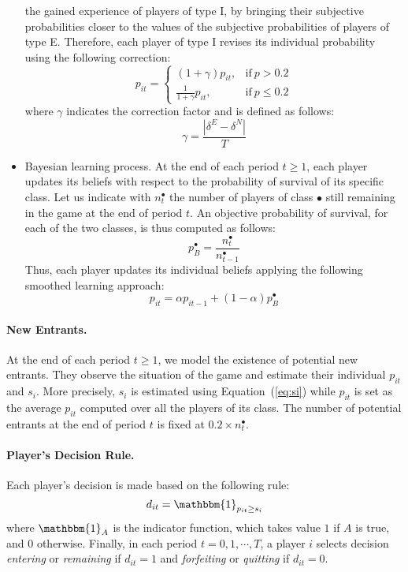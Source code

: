 \documentclass{article}
\begin{document}
\begin{itemize}
the gained experience of players of type I, by bringing their subjective
probabilities closer to the values of the subjective
probabilities of players of type E. Therefore, each player of type I revises
its individual probability using the following correction:
\begin{equation}
p_{it}=\begin{cases}
\left( 1+\gamma \right)p_{it}, & \text{if}~p > 0.2\\
\displaystyle \frac{1}{1+\gamma}p_{it}, & \text{if}~p \leq 0.2
\end{cases}
\label{eq:correction}
\end{equation}
where $\gamma$ indicates the correction factor and is defined as follows:
\begin{equation}
\gamma = \frac{|\delta^E-\delta^N|}{T}
\label{eq:gamma}
\end{equation}
\item Bayesian learning process. At the end of each period $t \geq 1$, each player
updates its beliefs with respect to the probability of survival of its specific
class. Let us indicate with $n^\bullet_t$ the number of players of class
$\bullet$ still remaining in the game at the end of period $t$. An objective
probability of survival, for each of the two classes, is thus computed as
follows:
\begin{equation}
p_{B}^\bullet = \frac{n^\bullet_t}{n^\bullet_{t-1}}
\label{eq:bayes}
\end{equation}
Thus, each player updates its individual beliefs applying the following
smoothed learning approach:
\begin{equation}
p_{it} = \alpha p_{it-1} + (1-\alpha)p_{B}^\bullet
\label{eq:smoothed-bayes}
\end{equation}
\end{itemize}

\paragraph{New Entrants.} At the end of each period $t \geq 1$, we model the
existence of potential new entrants. They observe the situation of the game
and estimate their individual $p_{it}$ and $s_i$. More precisely, $s_i$ is
estimated using Equation~(\ref{eq:si}) while $p_{it}$ is set as the average
$p_{it}$ computed over all the players of its class. The number of potential
entrants at the end of period $t$ is fixed at $0.2\times n^\bullet_t$.

\paragraph{Player's Decision Rule.} 
Each player's decision is made based on the following rule:
\begin{equation}
d_{it}= \mathbbm{1}_{p_{it}\geq s_i}
\label{eq:decision-i}
\end{equation}
where $\mathbbm{1}_{A}$ is the indicator function, which takes
value $1$ if $A$ is true, and $0$ otherwise. Finally, in each period
$t=0,1,\cdots,T$, a player $i$ selects decision
\textit{entering} or \textit{remaining} if $d_{it}= 1$ and
\textit{forfeiting} or \textit{quitting} if $d_{it}= 0$.
\end{document}
